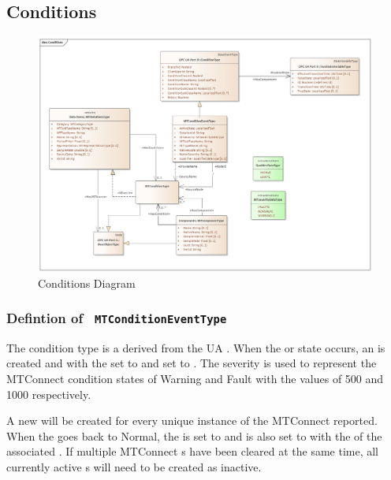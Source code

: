 \subsection{Conditions} \label{model:Conditions}

\begin{figure}[ht]
  \centering
    \includegraphics[width=1.0\textwidth]{./diagrams/types/Conditions.png}
  \caption{Conditions Diagram}
  \label{fig:Conditions}
\end{figure}

\FloatBarrier




\subsubsection{Defintion of \texttt{ MTConditionEventType}}
  \label{type:MTConditionEventType}

\FloatBarrier

The condition type is a derived from the UA . When the  or  state occurs, an   is created and with the  set to  and  set to .
The severity is used to represent the MTConnect condition states of Warning and Fault with the values of 500 and 1000 respectively. 

A new  will be created for every unique instance of the MTConnect  reported.  When the  goes back to Normal, the  is set  to  and  is also set to  with the  of the associated . If multiple MTConnect s have been cleared at the same time, all currently active  s will need to be created as inactive.

